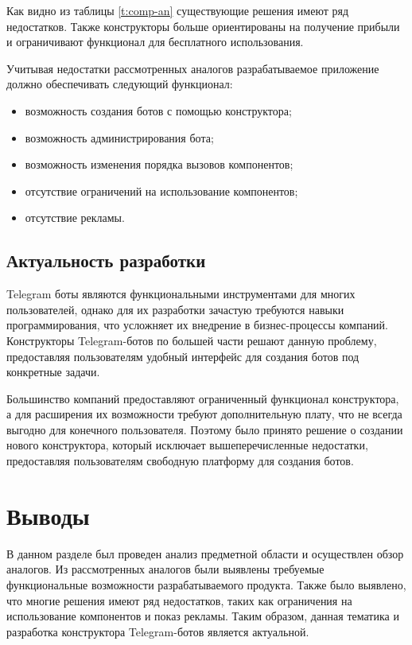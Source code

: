 Как видно из таблицы \ref{t:comp-an}
существующие решения имеют ряд недостатков.
Также конструкторы больше ориентированы на получение прибыли и
ограничивают функционал для бесплатного использования.

Учитывая недостатки рассмотренных аналогов разрабатываемое приложение должно обеспечивать следующий функционал:

\begin{itemize}

	\item возможность создания ботов с помощью конструктора;
	\item возможность администрирования бота;
	\item возможность изменения порядка вызовов компонентов;
	\item отсутствие ограничений на использование компонентов;
	\item отсутствие рекламы.

\end{itemize}

\subsection{Актуальность разработки}

Telegram боты являются функциональными инструментами для многих пользователей,
однако для их разработки зачастую требуются навыки программирования,
что усложняет их внедрение в бизнес-процессы компаний.
Конструкторы Telegram-ботов по большей части решают данную проблему,
предоставляя пользователям удобный интерфейс для создания ботов под конкретные задачи.

Большинство компаний предоставляют ограниченный
функционал конструктора, а для расширения их возможности требуют дополнительную
плату, что не всегда выгодно для конечного пользователя.
Поэтому было принято решение о создании нового конструктора, который исключает
вышеперечисленные недостатки, предоставляя пользователям свободную платформу для
создания ботов.

\section*{Выводы}

В данном разделе был проведен анализ предметной области и осуществлен обзор аналогов.
Из рассмотренных аналогов были выявлены требуемые
функциональные возможности разрабатываемого продукта.
Также было выявлено, что многие решения имеют ряд недостатков,
таких как ограничения на использование компонентов и показ рекламы.
Таким образом, данная тематика
и разработка конструктора Telegram-ботов является актуальной.



